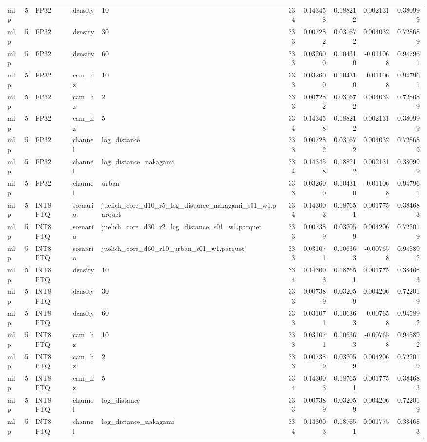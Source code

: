 \begin{tabular}{lrlllrrrrr}
mlp & 5 & FP32 & density & 10 & 334 & 0.143458 & 0.188212 & 0.002131 & 0.380999 \\
mlp & 5 & FP32 & density & 30 & 333 & 0.007282 & 0.031672 & 0.004032 & 0.728689 \\
mlp & 5 & FP32 & density & 60 & 333 & 0.032600 & 0.104310 & -0.011068 & 0.947961 \\
mlp & 5 & FP32 & cam\_hz & 10 & 333 & 0.032600 & 0.104310 & -0.011068 & 0.947961 \\
mlp & 5 & FP32 & cam\_hz & 2 & 333 & 0.007282 & 0.031672 & 0.004032 & 0.728689 \\
mlp & 5 & FP32 & cam\_hz & 5 & 334 & 0.143458 & 0.188212 & 0.002131 & 0.380999 \\
mlp & 5 & FP32 & channel & log\_distance & 333 & 0.007282 & 0.031672 & 0.004032 & 0.728689 \\
mlp & 5 & FP32 & channel & log\_distance\_nakagami & 334 & 0.143458 & 0.188212 & 0.002131 & 0.380999 \\
mlp & 5 & FP32 & channel & urban & 333 & 0.032600 & 0.104310 & -0.011068 & 0.947961 \\
mlp & 5 & INT8 PTQ & scenario & juelich\_core\_d10\_r5\_log\_distance\_nakagami\_s01\_w1.parquet & 334 & 0.143003 & 0.187651 & 0.001775 & 0.384683 \\
mlp & 5 & INT8 PTQ & scenario & juelich\_core\_d30\_r2\_log\_distance\_s01\_w1.parquet & 333 & 0.007389 & 0.032059 & 0.004206 & 0.722019 \\
mlp & 5 & INT8 PTQ & scenario & juelich\_core\_d60\_r10\_urban\_s01\_w1.parquet & 333 & 0.031071 & 0.106363 & -0.007658 & 0.945892 \\
mlp & 5 & INT8 PTQ & density & 10 & 334 & 0.143003 & 0.187651 & 0.001775 & 0.384683 \\
mlp & 5 & INT8 PTQ & density & 30 & 333 & 0.007389 & 0.032059 & 0.004206 & 0.722019 \\
mlp & 5 & INT8 PTQ & density & 60 & 333 & 0.031071 & 0.106363 & -0.007658 & 0.945892 \\
mlp & 5 & INT8 PTQ & cam\_hz & 10 & 333 & 0.031071 & 0.106363 & -0.007658 & 0.945892 \\
mlp & 5 & INT8 PTQ & cam\_hz & 2 & 333 & 0.007389 & 0.032059 & 0.004206 & 0.722019 \\
mlp & 5 & INT8 PTQ & cam\_hz & 5 & 334 & 0.143003 & 0.187651 & 0.001775 & 0.384683 \\
mlp & 5 & INT8 PTQ & channel & log\_distance & 333 & 0.007389 & 0.032059 & 0.004206 & 0.722019 \\
mlp & 5 & INT8 PTQ & channel & log\_distance\_nakagami & 334 & 0.143003 & 0.187651 & 0.001775 & 0.384683 \\

\end{tabular}
